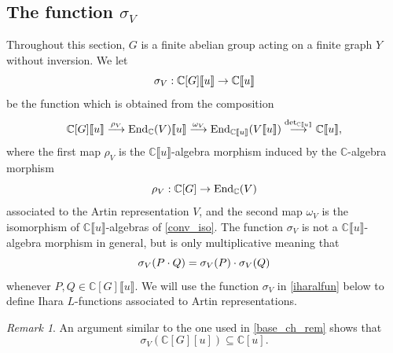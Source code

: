 \documentclass[11pt]{amsart}
\numberwithin{equation}{section}
\theoremstyle{remark}
\newtheorem{remark}[theorem]{Remark}
\theoremstyle{definition}
\begin{document}
\subsection{The function \texorpdfstring{$\sigma_{V}$}{}} \label{the_function_sigma}
Throughout this section, $G$ is a finite abelian group acting on a finite graph $Y$ without inversion.  We let
$${\rm \sigma}_{V}:\mathbb{C}[G]\llbracket u \rrbracket \rightarrow \mathbb{C}\llbracket u \rrbracket$$
be the function which is obtained from the composition
\begin{equation}
\mathbb{C}[G] \llbracket u \rrbracket \stackrel{\rho_{V}}{\longrightarrow} {\rm End}_{\mathbb{C}}(V) \llbracket u \rrbracket \stackrel{\omega_{V}}{\longrightarrow} {\rm End}_{\mathbb{C}\llbracket u \rrbracket}(V \llbracket u \rrbracket) \stackrel{{\rm det}_{\mathbb{C}\llbracket u \rrbracket}}{\longrightarrow} \mathbb{C}\llbracket u \rrbracket, 
\end{equation}
where the first map $\rho_{V}$ is the $\mathbb{C}\llbracket u \rrbracket$-algebra morphism induced by the $\mathbb{C}$-algebra morphism
$$\rho_{V}:\mathbb{C}[G] \rightarrow {\rm End}_{\mathbb{C}}(V) $$
associated to the Artin representation $V$, and the second map $\omega_{V}$ is the isomorphism of $\mathbb{C}\llbracket u \rrbracket$-algebras of \cref{conv_iso}.  The function $\sigma_{V}$ is not a $\mathbb{C}\llbracket u\rrbracket$-algebra morphism in general, but is only multiplicative meaning that 
$${\rm \sigma}_{V}(P \cdot Q) = {\rm \sigma}_{V}(P) \cdot {\rm \sigma}_{V}(Q) $$ 
whenever $P,Q \in \mathbb{C}[G]\llbracket u \rrbracket$.  We will use the function $\sigma_{V}$ in \cref{iharalfun} below to define Ihara $L$-functions associated to Artin representations.  

\begin{remark}
An argument similar to the one used in \cref{base_ch_rem} shows that 
$$\sigma_{V}(\mathbb{C}[G][u]) \subseteq \mathbb{C}[u]. $$
\end{remark}
\end{document}
